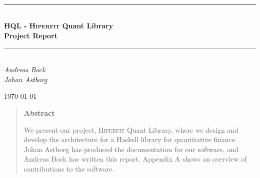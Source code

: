 \documentclass[a4paper,11pt]{scrreprt}
\def\Title{\bf HQL - \textsc{Hiperfit} Quant Library\\ {\Large Project Report}}
\newcommand{\HRule}{\rule{\linewidth}{0.5mm}}
\begin{document}
\begin{titlepage}

\textsc{\LARGE }\\[1.5cm]
\textsc{\Large }\\[0.5cm]
\textsc{\large }\\[0.5cm]
 
\begin{center}
\HRule \\[0.5cm]
\huge \bfseries \Title\\
\HRule \\[0.5cm]

\normalfont 
\Large
\textit{Andreas Bock \\ Johan Astborg }\\[3cm]

\date{\today}

{\today}\\[4cm]
 
\vfill
\end{center}

\end{titlepage}
\begin{abstract}
\begin{center}
\textbf{Abstract}
\end{center}
We present our project, \textsc{Hiperfit} Quant Library, where we design and
develop the architecture for a Haskell library for quantitative finance.
Johan Astborg has produced the documentation\cite{hqldoc} for our software, and
Andreas Bock has written this report. Appendix A shows an overview of
contributions to the software.
\end{abstract}
\tableofcontents










\end{document}
